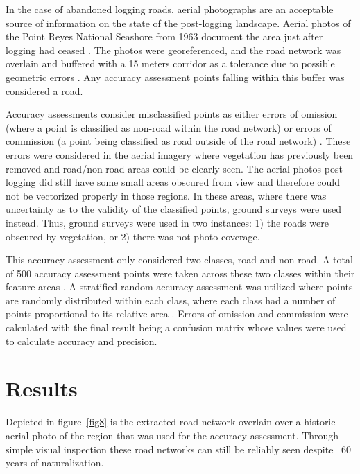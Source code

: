 \documentclass[remotesensing,article,submit,pdftex,moreauthors]{Definitions/mdpi}
\begin{document}
In the case of abandoned logging roads, aerial photographs are an acceptable source of information on the state of the post-logging landscape. Aerial photos of the Point Reyes National Seashore from 1963 document the area just after logging had ceased \cite{becker}. The photos were georeferenced, and the road network was overlain and buffered with a 15 meters corridor as a tolerance due to possible geometric errors \cite{zhen}. Any accuracy assessment points falling within this buffer was considered a road. 

Accuracy assessments consider misclassified points as either errors of omission (where a point is classified as non-road within the road network) or errors of commission (a point being classified as road outside of the road network) \cite{lillesand}. These errors were considered in the aerial imagery where vegetation has previously been removed and road/non-road areas could be clearly seen. The aerial photos post logging did still have some small areas obscured from view and therefore could not be vectorized properly in those regions. In these areas, where there was uncertainty as to the validity of the classified points, ground surveys were used instead. Thus, ground surveys were used in two instances: 1) the roads were obscured by vegetation, or 2) there was not photo coverage.

This accuracy assessment only considered two classes, road and non-road.  A total of 500 accuracy assessment points were taken across these two classes within their feature areas \cite{guillen, lillesand}. A stratified random accuracy assessment was utilized where points are randomly distributed within each class, where each class had a number of points proportional to its relative area \cite{foody}. Errors of omission and commission were calculated with the final result being a confusion matrix whose values were used to calculate accuracy and precision.
\section{Results}
Depicted in figure~\ref{fig8} is the extracted road network overlain over a historic aerial photo of the region that was used for the accuracy assessment. Through simple visual inspection these road networks can still be reliably seen despite ~60 years of naturalization.
\end{document}
